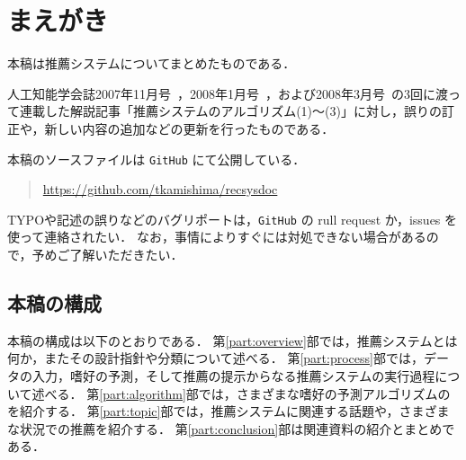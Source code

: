 \chapter*{まえがき}
\label{chap:preface}

本稿は推薦システムについてまとめたものである．

人工知能学会誌2007年11月号~\cite{jpublist:076}，2008年1月号~\cite{jpublist:081}，および2008年3月号~\cite{jpublist:083}の3回に渡って連載した解説記事「推薦システムのアルゴリズム(1)〜(3)」に対し，誤りの訂正や，新しい内容の追加などの更新を行ったものである．

本稿のソースファイルは \texttt{GitHub} にて公開している．
\begin{quote}
\url{https://github.com/tkamishima/recsysdoc}
\end{quote}
TYPOや記述の誤りなどのバグリポートは，\texttt{GitHub} の rull request か，issues を使って連絡されたい．
なお，事情によりすぐには対処できない場合があるので，予めご了解いただきたい．

\section*{本稿の構成}
\label{sec:preface-organization}

本稿の構成は以下のとおりである．
第\ref{part:overview}部では，推薦システムとは何か，またその設計指針や分類について述べる．
第\ref{part:process}部では，データの入力，嗜好の予測，そして推薦の提示からなる推薦システムの実行過程について述べる．
第\ref{part:algorithm}部では，さまざまな嗜好の予測アルゴリズムのを紹介する．
第\ref{part:topic}部では，推薦システムに関連する話題や，さまざまな状況での推薦を紹介する．
第\ref{part:conclusion}部は関連資料の紹介とまとめである．
